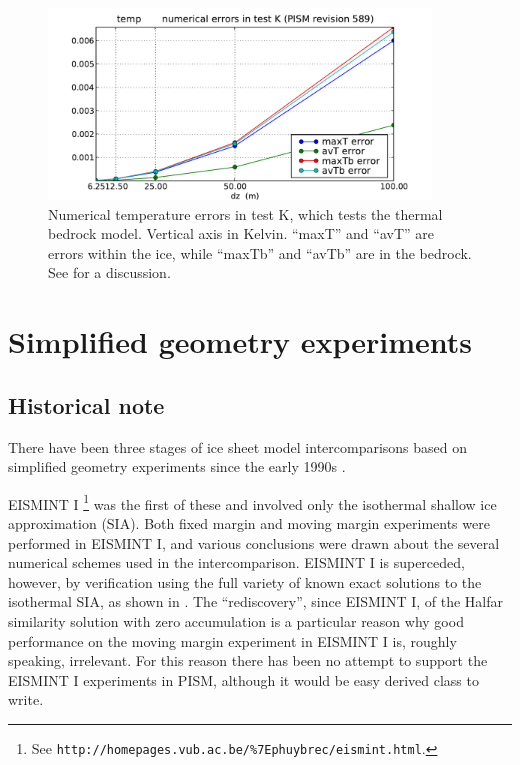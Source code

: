 \documentclass[11pt,final]{amsart}
\begin{document}
\begin{figure}[ht]
\includegraphics[width=4.0in,keepaspectratio=true]{figs/temperrs_K}
\caption{Numerical temperature errors in test K, which tests the thermal bedrock model.  Vertical axis in Kelvin.  ``maxT'' and ``avT'' are errors within the ice, while ``maxTb'' and ``avTb'' are in the bedrock.  See \cite{BuelerTestK} for a discussion.}
\label{fig:temperrsK}
\end{figure}


\clearpage\newpage
\section{Simplified geometry experiments}\label{sect:simp}

\subsection{Historical note}  There have been three stages of ice sheet model intercomparisons based on simplified geometry experiments since the early 1990s \cite{BuelerSpray}.

EISMINT I \cite[ European Ice Sheet Modeling INiTiative]{EISMINT96}\footnote{See \texttt{http://homepages.vub.ac.be/\%7Ephuybrec/eismint.html}.} was the first of these and involved only the isothermal shallow ice approximation (SIA).  Both fixed margin and moving margin experiments were performed in EISMINT I, and various conclusions were drawn about the several numerical schemes used in the intercomparison.  EISMINT I is superceded, however, by verification using the full variety of known exact solutions to the isothermal SIA, as shown in \cite{BLKCB}.  The ``rediscovery'', since EISMINT I, of the Halfar similarity solution with zero accumulation \cite{Halfar83} is a particular reason why good performance on the moving margin experiment in EISMINT I is, roughly speaking, irrelevant.  For this reason there has been no attempt to support the EISMINT I experiments in PISM, although it would be easy derived class to write.
\end{document}
